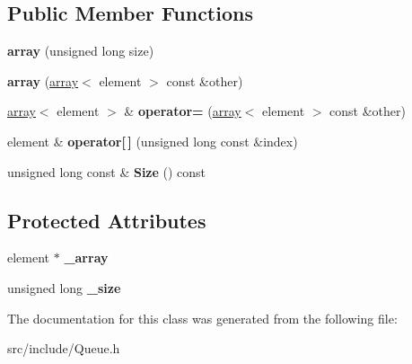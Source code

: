 \subsection*{Public Member Functions}
\begin{DoxyCompactItemize}
\item 
\hypertarget{classarray_ab04f74b399dab5f36c3370b99f297ab2}{{\bfseries array} (unsigned long size)}\label{classarray_ab04f74b399dab5f36c3370b99f297ab2}

\item 
\hypertarget{classarray_a4a3865891a6f42c01f6032ef9dad2559}{{\bfseries array} (\hyperlink{classarray}{array}$<$ element $>$ const \&other)}\label{classarray_a4a3865891a6f42c01f6032ef9dad2559}

\item 
\hypertarget{classarray_a1d26ed610f1b94df785a107ef05fd28b}{\hyperlink{classarray}{array}$<$ element $>$ \& {\bfseries operator=} (\hyperlink{classarray}{array}$<$ element $>$ const \&other)}\label{classarray_a1d26ed610f1b94df785a107ef05fd28b}

\item 
\hypertarget{classarray_a4f78f96a61f98c7cd0134aaf1b29a5fe}{element \& {\bfseries operator\mbox{[}$\,$\mbox{]}} (unsigned long const \&index)}\label{classarray_a4f78f96a61f98c7cd0134aaf1b29a5fe}

\item 
\hypertarget{classarray_a7a66a4fb48be95b2dd2347d4c934e258}{unsigned long const \& {\bfseries Size} () const }\label{classarray_a7a66a4fb48be95b2dd2347d4c934e258}

\end{DoxyCompactItemize}
\subsection*{Protected Attributes}
\begin{DoxyCompactItemize}
\item 
\hypertarget{classarray_a6020147bc5cad85d404c414bf3fa028b}{element $\ast$ {\bfseries \+\_\+array}}\label{classarray_a6020147bc5cad85d404c414bf3fa028b}

\item 
\hypertarget{classarray_a3aeea3ae3fc0a532dd92451d1d5c1aca}{unsigned long {\bfseries \+\_\+size}}\label{classarray_a3aeea3ae3fc0a532dd92451d1d5c1aca}

\end{DoxyCompactItemize}


The documentation for this class was generated from the following file\+:\begin{DoxyCompactItemize}
\item 
src/include/Queue.\+h\end{DoxyCompactItemize}
